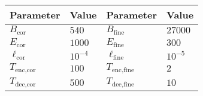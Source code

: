 \begin{table}[h]
    \centering
    \begin{tabular}{ll||ll}
    \hline
    Parameter                   & Value     & Parameter                    & Value     \\ \hline
    $B_{\text{cor}}$            & $540$     & $B_{\text{fine}}$             & $27000$   \\
    $E_{\text{cor}}$            & $1000$    & $E_{\text{fine}}$             & $300$     \\
    $\ell_{\text{cor}}$         & $10^{-4}$ & $\ell_{\text{fine}}$          & $10^{-5}$ \\
    $T_{\text{enc},\text{cor}}$ & $100$     & $T_{\text{enc},\text{fine}}$ & $2$       \\
    $T_{\text{dec},\text{cor}}$ & $500$     & $T_{\text{dec},\text{fine}}$ & $10$      \\ \hline
    \end{tabular}
\end{table}
